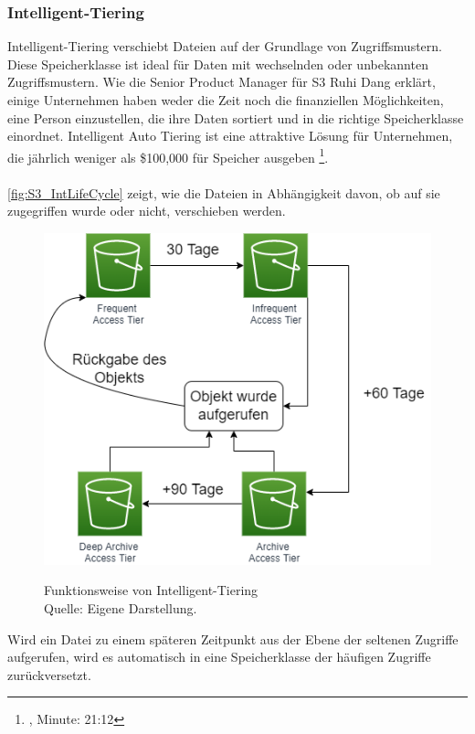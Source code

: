 {\subsubsection{Intelligent-Tiering}
Intelligent-Tiering verschiebt Dateien auf der Grundlage von Zugriffsmustern. Diese Speicherklasse ist ideal für Daten mit wechselnden oder unbekannten Zugriffsmustern. 
Wie die Senior Product Manager für S3 Ruhi Dang erklärt, einige Unternehmen haben weder die Zeit noch die finanziellen Möglichkeiten, eine Person einzustellen, die ihre Daten sortiert und in die richtige Speicherklasse einordnet. Intelligent Auto Tiering ist eine attraktive Lösung für Unternehmen, die jährlich weniger als \$100,000 für Speicher ausgeben \footnote{\cite{AMZ16}, Minute: 21:12}.
\\\\
\autoref{fig:S3_IntLifeCycle} zeigt, wie die Dateien in Abhängigkeit davon, ob auf sie zugegriffen wurde oder nicht, verschieben werden. 
\begin{figure}[h!]
  \centering
  \includegraphics[scale=0.7]{sources/S3_IntLifeCycle}
  \caption[Funktionsweise von Intelligent-Tiering]{}\label{fig:S3_IntLifeCycle} Funktionsweise von Intelligent-Tiering\\
  Quelle: Eigene Darstellung. 
\end{figure}
Wird ein Datei zu einem späteren Zeitpunkt aus der Ebene der seltenen Zugriffe aufgerufen, wird es automatisch in eine Speicherklasse der häufigen Zugriffe zurückversetzt.















}
